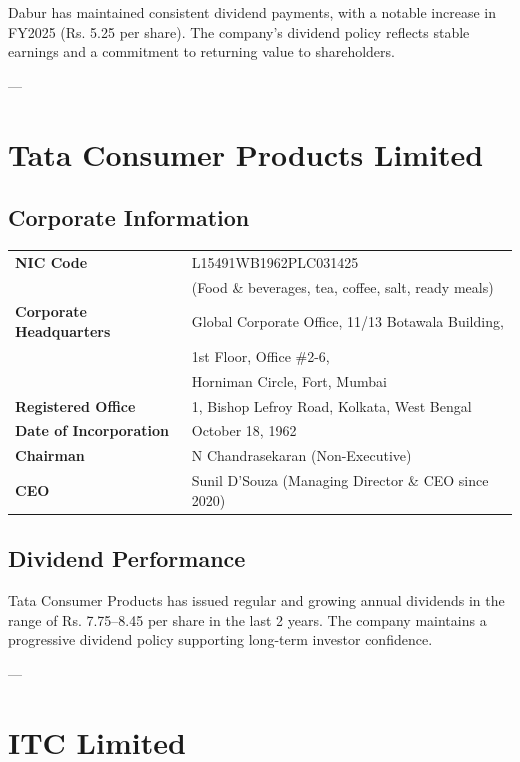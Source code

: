 \documentclass[12pt, a4paper]{report}
\begin{document}
Dabur has maintained consistent dividend payments, with a notable increase in FY2025 (Rs. 5.25 per share). The company's dividend policy reflects stable earnings and a commitment to returning value to shareholders.

---

\section{Tata Consumer Products Limited}

\subsection{Corporate Information}

\begin{tabular}{ll}
    \textbf{NIC Code} & L15491WB1962PLC031425 \\
                      & (Food \& beverages, tea, coffee, salt, ready meals) \\
    \textbf{Corporate Headquarters} & Global Corporate Office, 11/13 Botawala Building, \\
                                    & 1st Floor, Office \#2-6, \\
                                    & Horniman Circle, Fort, Mumbai \\
    \textbf{Registered Office} & 1, Bishop Lefroy Road, Kolkata, West Bengal \\
    \textbf{Date of Incorporation} & October 18, 1962 \\
    \textbf{Chairman} & N Chandrasekaran (Non-Executive) \\
    \textbf{CEO} & Sunil D'Souza (Managing Director \& CEO since 2020) \\
\end{tabular}

\subsection{Dividend Performance}

Tata Consumer Products has issued regular and growing annual dividends in the range of Rs. 7.75–8.45 per share in the last 2 years. The company maintains a progressive dividend policy supporting long-term investor confidence.

---

\section{ITC Limited}
\end{document}
